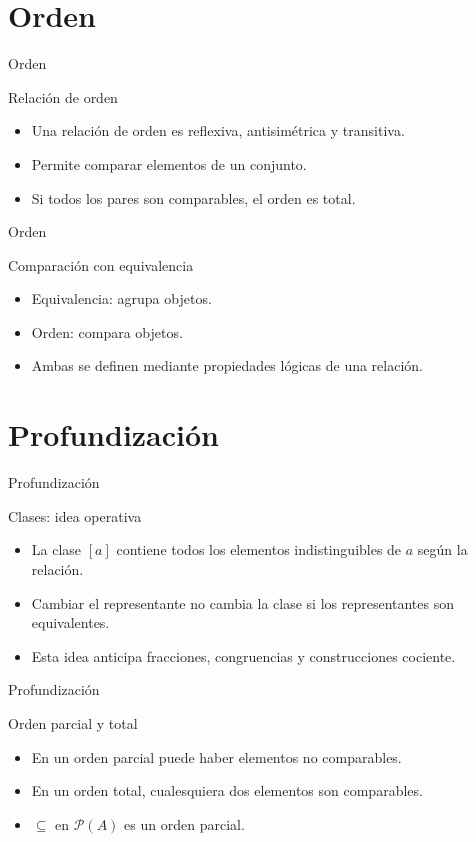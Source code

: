 \documentclass[aspectratio=169,11pt]{beamer}
\begin{document}
\section{Orden}

\begin{frame}{Orden}
\begin{block}{Relación de orden}
\begin{itemize}
  \item Una relación de orden es reflexiva, antisimétrica y transitiva.
  \item Permite comparar elementos de un conjunto.
  \item Si todos los pares son comparables, el orden es total.
\end{itemize}
\end{block}
\end{frame}

\begin{frame}{Orden}
\begin{block}{Comparación con equivalencia}
\begin{itemize}
  \item Equivalencia: agrupa objetos.
  \item Orden: compara objetos.
  \item Ambas se definen mediante propiedades lógicas de una relación.
\end{itemize}
\end{block}
\end{frame}

\section{Profundización}

\begin{frame}{Profundización}
\begin{block}{Clases: idea operativa}
\begin{itemize}
  \item La clase \([a]\) contiene todos los elementos indistinguibles de \(a\) según la relación.
  \item Cambiar el representante no cambia la clase si los representantes son equivalentes.
  \item Esta idea anticipa fracciones, congruencias y construcciones cociente.
\end{itemize}
\end{block}
\end{frame}

\begin{frame}{Profundización}
\begin{block}{Orden parcial y total}
\begin{itemize}
  \item En un orden parcial puede haber elementos no comparables.
  \item En un orden total, cualesquiera dos elementos son comparables.
  \item \(\subseteq\) en \(\mathcal{P}(A)\) es un orden parcial.
\end{itemize}
\end{block}
\end{frame}
\end{document}
